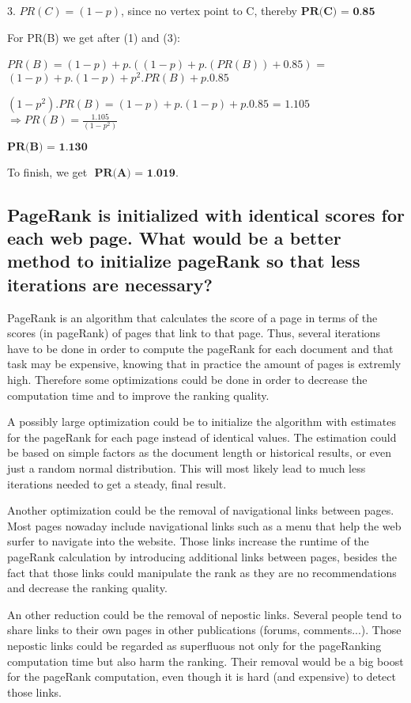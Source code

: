 \documentclass{scrartcl}
\begin{document}
3. $PR(C) = (1 - p)$, since no vertex point to C, thereby $\textbf{PR(C) = 0.85}$

For PR(B) we get after (1) and (3):

$PR(B) = (1 - p) + p.( (1 - p) + p.( PR(B))+ 0.85)$ = $(1-p) + p.(1-p) + p^2.PR(B) + p.0.85$

$(1- p^2). PR(B) = (1 - p) + p. (1-p) + p. 0.85$ = $ 1.105$ $ \Rightarrow PR(B) = \frac{1.105}{(1- p^2)}$

$\textbf{PR(B) = 1.130}$

To finish, we get $\textbf{ PR(A) = 1.019}$.

\subsection { PageRank is initialized with identical scores for each web page. What would be a better
method to initialize pageRank so that less iterations are necessary?}

PageRank is an algorithm that calculates the score of a page in terms of the scores (in pageRank) of pages that link to that page. Thus, several iterations have to be done in order to compute the pageRank for each document and that task may be expensive, knowing that in practice the amount of pages is extremly high. Therefore some optimizations could be done in order to decrease the computation time and to improve the ranking quality.

A possibly large optimization could be to initialize the algorithm with estimates for the pageRank for each page instead of identical values. The estimation could be based on simple factors as the document length or historical results, or even just a random normal distribution. This will most likely lead to much less iterations needed to get a steady, final result.

Another optimization could be the removal of navigational links between pages. Most pages nowaday include navigational links such as a menu that help the web surfer to navigate into the website. Those links increase the runtime of the pageRank calculation by introducing additional links between pages, besides the fact that those links could manipulate the rank as they are no recommendations and decrease the ranking quality.

An other reduction could be the removal of nepostic links. Several people tend to share links to their own pages in other publications (forums, comments...). Those nepostic links could be regarded as superfluous not only for the pageRanking computation time but also harm the ranking. Their removal would be a big boost for the pageRank computation, even though it is hard (and expensive) to detect those links.
\end{document}
